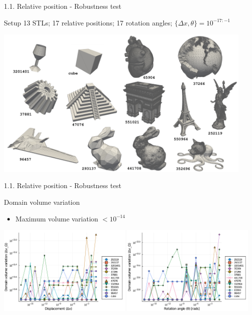 \documentclass{beamer}
\begin{document}
\begin{frame}{1.1. Relative position - Robustness test}
  \begin{block}{Setup}
    13 STLs; 17 relative positions; 17 rotation angles;  $\{\Delta x, \theta\} = 10^{-17:-1}$
  \end{block}
  \includegraphics[width=0.95\textwidth]{matrix_ids.pdf}
\end{frame}



\begin{frame}{1.1. Relative position - Robustness test}

  \begin{block}{Domain volume variation}
  \begin{itemize}
    \item
      Maximum volume variation $< 10^{-14}$
  \end{itemize}
  \end{block}

  \includegraphics[width=0.49\textwidth]{../analysis/plots/x_displacement_y_domain_volume}
  \includegraphics[width=0.49\textwidth]{../analysis/plots/x_rotation_y_domain_volume}
\end{frame}
\end{document}
